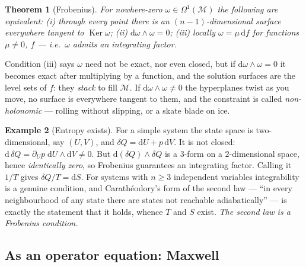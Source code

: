 \documentclass[10pt,a4paper]{article}
\newcommand{\dd}{\mathrm{d}}
\newcommand{\M}{\mathcal{M}}
\newcommand{\Om}{\Omega}
\newcommand{\Ker}{\operatorname{Ker}}
\theoremstyle{plain}
\newtheorem{thm}{Theorem}[section]
\theoremstyle{definition}
\newtheorem{ex}[thm]{Example}
\numberwithin{equation}{section}
\begin{document}
\begin{thm}[Frobenius]\label{thm:frobenius}
For nowhere-zero $\omega\in\Om^1(\M)$ the following are equivalent: (i) through every point
there is an $(n-1)$-dimensional surface everywhere tangent to $\Ker\omega$; (ii)
$\dd\omega\wedge\omega=0$; (iii) locally $\omega=\mu\,\dd f$ for functions $\mu\ne0$, $f$ ---
i.e.\ $\omega$ admits an \emph{integrating factor}.
\end{thm}

\noindent Condition (iii) says $\omega$ need not be exact, nor even closed, but if
$\dd\omega\wedge\omega=0$ it becomes exact after multiplying by a function, and the solution
surfaces are the level sets of $f$: they \emph{stack} to fill $\M$. If
$\dd\omega\wedge\omega\ne0$ the hyperplanes twist as you move, no surface is everywhere tangent
to them, and the constraint is called \emph{non-holonomic} --- rolling without slipping, or a
skate blade on ice.

\begin{ex}[Entropy exists]\label{ex:entropy}
For a simple system the state space is two-dimensional, say $(U,V)$, and
$\delta Q=\dd U+p\,\dd V$. It is not closed: $\dd\,\delta Q=\partial_Up\;\dd U\wedge\dd V\ne0$.
But $\dd(\delta Q)\wedge\delta Q$ is a $3$-form on a $2$-dimensional space, hence
\emph{identically zero}, so Frobenius guarantees an integrating factor. Calling it $1/T$ gives
$\delta Q/T=\dd S$. For systems with $n\ge3$ independent variables integrability is a genuine
condition, and Carath\'eodory's form of the second law --- ``in every neighbourhood of any state
there are states not reachable adiabatically'' --- is exactly the statement that it holds, whence
$T$ and $S$ exist. \emph{The second law is a Frobenius condition.}
\end{ex}

\subsection{As an operator equation: Maxwell}
\end{document}
